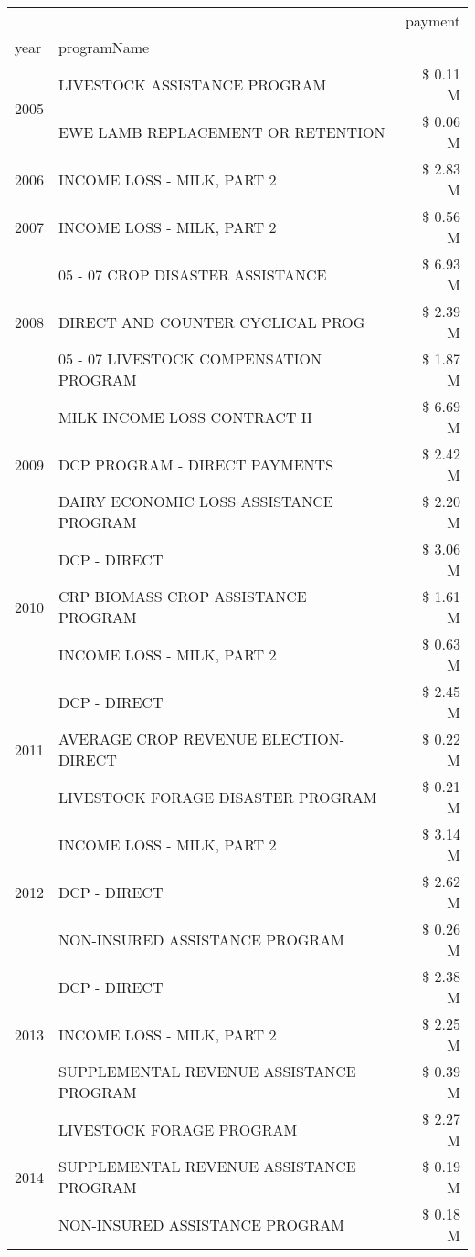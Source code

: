 \begin{tabular}{llr}
\toprule
 &  & payment \\
year & programName &  \\
\midrule
\multirow[t]{2}{*}{2005} & LIVESTOCK ASSISTANCE PROGRAM & \$ 0.11 M \\
 & EWE LAMB REPLACEMENT OR RETENTION & \$ 0.06 M \\
\cline{1-3}
2006 & INCOME LOSS - MILK, PART 2 & \$ 2.83 M \\
\cline{1-3}
2007 & INCOME LOSS - MILK, PART 2 & \$ 0.56 M \\
\cline{1-3}
\multirow[t]{3}{*}{2008} & 05 - 07 CROP DISASTER ASSISTANCE & \$ 6.93 M \\
 & DIRECT AND COUNTER CYCLICAL PROG & \$ 2.39 M \\
 & 05 - 07 LIVESTOCK COMPENSATION PROGRAM & \$ 1.87 M \\
\cline{1-3}
\multirow[t]{3}{*}{2009} & MILK INCOME LOSS CONTRACT II & \$ 6.69 M \\
 & DCP PROGRAM - DIRECT PAYMENTS & \$ 2.42 M \\
 & DAIRY ECONOMIC LOSS ASSISTANCE PROGRAM & \$ 2.20 M \\
\cline{1-3}
\multirow[t]{3}{*}{2010} & DCP - DIRECT & \$ 3.06 M \\
 & CRP BIOMASS CROP ASSISTANCE PROGRAM & \$ 1.61 M \\
 & INCOME LOSS - MILK, PART 2 & \$ 0.63 M \\
\cline{1-3}
\multirow[t]{3}{*}{2011} & DCP - DIRECT & \$ 2.45 M \\
 & AVERAGE CROP REVENUE ELECTION-DIRECT & \$ 0.22 M \\
 & LIVESTOCK FORAGE DISASTER PROGRAM & \$ 0.21 M \\
\cline{1-3}
\multirow[t]{3}{*}{2012} & INCOME LOSS - MILK, PART 2 & \$ 3.14 M \\
 & DCP - DIRECT & \$ 2.62 M \\
 & NON-INSURED ASSISTANCE PROGRAM & \$ 0.26 M \\
\cline{1-3}
\multirow[t]{3}{*}{2013} & DCP - DIRECT & \$ 2.38 M \\
 & INCOME LOSS - MILK, PART 2 & \$ 2.25 M \\
 & SUPPLEMENTAL REVENUE ASSISTANCE PROGRAM & \$ 0.39 M \\
\cline{1-3}
\multirow[t]{3}{*}{2014} & LIVESTOCK FORAGE PROGRAM & \$ 2.27 M \\
 & SUPPLEMENTAL REVENUE ASSISTANCE PROGRAM & \$ 0.19 M \\
 & NON-INSURED ASSISTANCE PROGRAM & \$ 0.18 M \\

\end{tabular}
